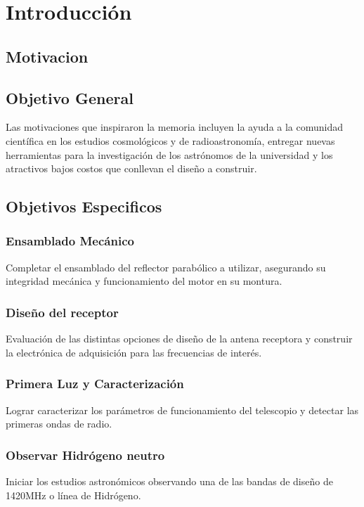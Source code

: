 \chapter{Introducción}
\section{Motivacion}
\section{Objetivo General}
Las motivaciones que inspiraron la memoria incluyen la ayuda a la comunidad científica en los estudios cosmológicos y de radioastronomía, entregar nuevas herramientas para la investigación de los astrónomos de la universidad y los atractivos bajos costos que conllevan el diseño a construir.
\section{Objetivos Especificos}
\subsection{Ensamblado Mecánico}

Completar el ensamblado del reflector parabólico a utilizar, asegurando su integridad mecánica y funcionamiento del motor en su montura.

\subsection{Diseño del receptor}

Evaluación de las distintas opciones de diseño de la antena receptora y construir la electrónica de adquisición para las frecuencias de interés.

\subsection{Primera Luz y Caracterización}

Lograr caracterizar los parámetros de funcionamiento del telescopio y detectar las primeras ondas de radio.

\subsection{Observar Hidrógeno neutro}


Iniciar los estudios astronómicos observando una de las bandas de diseño de 1420MHz o línea de Hidrógeno.